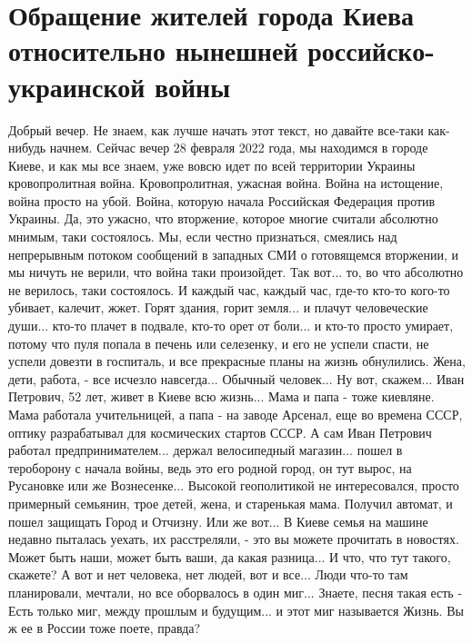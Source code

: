  
 
 
 
 

\section{Обращение жителей города Киева относительно нынешней российско-украинской войны}

Добрый вечер. Не знаем, как лучше начать этот текст, но давайте все-таки
как-нибудь начнем. Сейчас вечер 28 февраля 2022 года, мы находимся в городе
Киеве, и как мы все знаем, уже вовсю идет по всей территории Украины
кровопролитная война. Кровопролитная, ужасная война. Война на истощение, война
просто на убой. Война, которую начала Российская Федерация против Украины. Да,
это ужасно, что вторжение, которое многие считали абсолютно мнимым, таки
состоялось. Мы, если честно признаться, смеялись над непрерывным потоком
сообщений в западных СМИ о готовящемся вторжении, и мы ничуть не верили, что
война таки произойдет. Так вот... то, во что абсолютно не верилось, таки
состоялось. И каждый час, каждый час, где-то кто-то кого-то убивает, калечит,
жжет. Горят здания, горит земля... и плачут человеческие души...  кто-то плачет
в подвале, кто-то орет от боли... и кто-то просто умирает, потому что пуля
попала в печень или селезенку, и его не успели спасти, не успели довезти в
госпиталь, и все прекрасные планы на жизнь обнулились. Жена, дети, работа, -
все исчезло навсегда... Обычный человек... Ну вот, скажем...  Иван Петрович, 52
лет, живет в Киеве всю жизнь... Мама и папа - тоже киевляне.  Мама работала
учительницей, а папа - на заводе Арсенал, еще во времена СССР, оптику
разрабатывал для космических стартов СССР.  А сам Иван Петрович работал
предпринимателем... держал велосипедный магазин... пошел в тероборону с начала
войны, ведь это его родной город, он тут вырос, на Русановке или же
Вознесенке... Высокой геополитикой не интересовался, просто примерный семьянин,
трое детей, жена, и старенькая мама.  Получил автомат, и пошел защищать Город и
Отчизну. Или же вот... В Киеве семья на машине недавно пыталась уехать, их
расстреляли, - это вы можете прочитать в новостях. Может быть наши, может быть
ваши, да какая разница... И что, что тут такого, скажете? А вот и нет человека,
нет людей, вот и все... Люди что-то там планировали, мечтали, но все оборвалось
в один миг...  Знаете, песня такая есть - Есть только миг, между прошлым и
будущим... и этот миг называется Жизнь. Вы ж ее в России тоже поете, правда?

